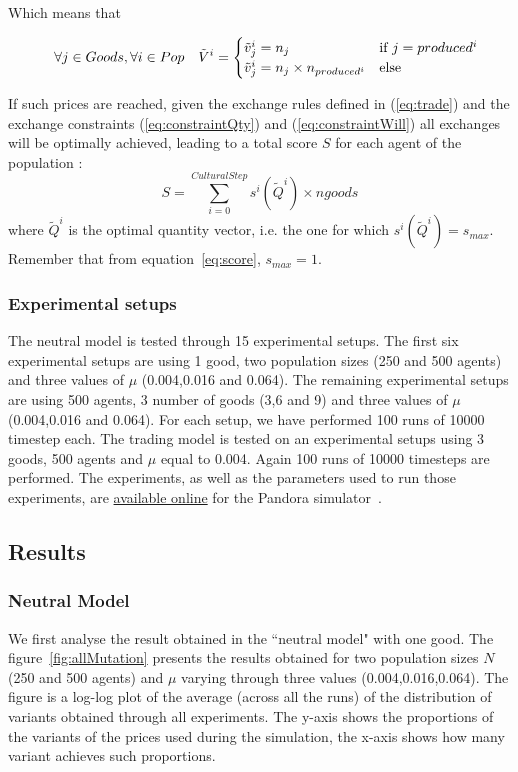 \documentclass[a4paper]{article}
\begin{document}
Which means that 

\begin{equation}
	\quad \forall j \in Goods, \forall i \in Pop \quad \tilde{V}^i = 
	\begin{cases}
		\tilde{v}^i_j = n_j & \text{if $ j=produced^i$}\\
		 \tilde{v}^i_j = n_j \times n_{produced^i} & \text{else}
	\end{cases}\label{eq:optimum}
\end{equation}


If such prices are reached, given the exchange rules defined in (\ref{eq:trade}) and the exchange constraints (\ref{eq:constraintQty}) and (\ref{eq:constraintWill}) all exchanges will be optimally achieved, leading to a total score $S$ for each agent of the population : 
$$ S = \sum_{i=0}^{CulturalStep}  s^i(\tilde{Q}^i) \times ngoods $$ 
where $\tilde{Q}^i$ is the optimal quantity vector, i.e. the one for which $s^i(\tilde{Q}^i) = s_{max}$. Remember that from equation~\ref{eq:score}, $s_{max}=1$.

\subsubsection{Experimental setups}
The neutral model is tested through 15 experimental setups. The first six experimental setups are using 1 good, two population sizes (250 and 500 agents) and three values of $\mu$ (0.004,0.016 and 0.064). The remaining experimental setups are using 500 agents, 3 number of goods (3,6 and 9) and three values of $\mu$ (0.004,0.016 and 0.064). For each setup, we have performed 100 runs of 10000 timestep each. The trading model is tested on an experimental setups using 3 goods, 500 agents and $\mu$ equal to 0.004. Again 100 runs of 10000 timesteps are performed. The experiments, as well as the parameters used to run those experiments, are \href{https://github.com/montanier/CMR-WSC-CoEvolutionTradeCulture}{available online} \cite{github_2015} for the Pandora simulator~\cite{rubiocampillo_2014}.

\subsection{Results}
\subsubsection{Neutral Model}

We first analyse the result obtained in the ``neutral model" with one good. The figure~\ref{fig:allMutation} presents the results obtained for two population sizes $N$	 (250 and 500 agents) and $\mu$ varying through three values (0.004,0.016,0.064). The figure is a log-log plot of the average (across all the runs) of the distribution of variants obtained through all experiments. The y-axis shows the proportions of the variants of the prices used during the simulation, the x-axis shows how many variant achieves such proportions.
\end{document}
